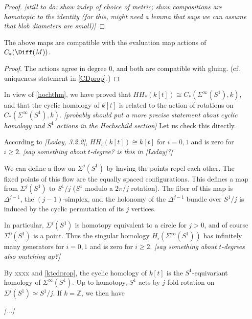 \documentclass[11pt,leqno]{amsart}
\def\z{\mathbb{Z}}
\def\nn#1{{{\it \small [#1]}}}
\begin{document}
\begin{proof}
\nn{still to do: show indep of choice of metric; show compositions are homotopic to the identity
(for this, might need a lemma that says we can assume that blob diameters are small)}
\end{proof}


\begin{prop} \label{ktcdprop}
The above maps are compatible with the evaluation map actions of $C_*(\Diff(M))$.
\end{prop}

\begin{proof}
The actions agree in degree 0, and both are compatible with gluing.
(cf. uniqueness statement in \ref{CDprop}.)
\end{proof}

\medskip

In view of \ref{hochthm}, we have proved that $HH_*(k[t]) \cong C_*(\Sigma^\infty(S^1), k)$,
and that the cyclic homology of $k[t]$ is related to the action of rotations
on $C_*(\Sigma^\infty(S^1), k)$.
\nn{probably should put a more precise statement about cyclic homology and $S^1$ actions in the Hochschild section}
Let us check this directly.

According to \nn{Loday, 3.2.2}, $HH_i(k[t]) \cong k[t]$ for $i=0,1$ and is zero for $i\ge 2$.
\nn{say something about $t$-degree?  is this in [Loday]?}

We can define a flow on $\Sigma^j(S^1)$ by having the points repel each other.
The fixed points of this flow are the equally spaced configurations.
This defines a map from $\Sigma^j(S^1)$ to $S^1/j$ ($S^1$ modulo a $2\pi/j$ rotation).
The fiber of this map is $\Delta^{j-1}$, the $(j-1)$-simplex, 
and the holonomy of the $\Delta^{j-1}$ bundle
over $S^1/j$ is induced by the cyclic permutation of its $j$ vertices.

In particular, $\Sigma^j(S^1)$ is homotopy equivalent to a circle for $j>0$, and
of course $\Sigma^0(S^1)$ is a point.
Thus the singular homology $H_i(\Sigma^\infty(S^1))$ has infinitely many generators for $i=0,1$
and is zero for $i\ge 2$.
\nn{say something about $t$-degrees also matching up?}

By xxxx and \ref{ktcdprop}, 
the cyclic homology of $k[t]$ is the $S^1$-equivariant homology of $\Sigma^\infty(S^1)$.
Up to homotopy, $S^1$ acts by $j$-fold rotation on $\Sigma^j(S^1) \simeq S^1/j$.
If $k = \z$, we then have 





\nn{...}
\end{document}
